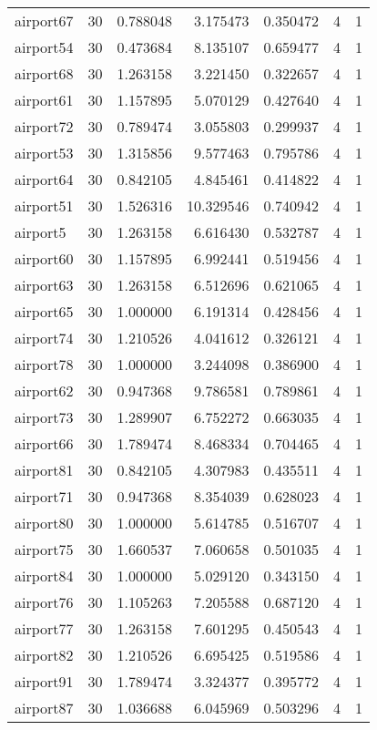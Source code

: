 \documentclass[../../../thesis.tex]{subfiles}
\begin{document}
\begin{longtable}{|l|r|r|r|r|r|r|}
airport67 & 30 & 0.788048 & 3.175473 & 0.350472 & 4 & 1 \\
airport54 & 30 & 0.473684 & 8.135107 & 0.659477 & 4 & 1 \\
airport68 & 30 & 1.263158 & 3.221450 & 0.322657 & 4 & 1 \\
airport61 & 30 & 1.157895 & 5.070129 & 0.427640 & 4 & 1 \\
airport72 & 30 & 0.789474 & 3.055803 & 0.299937 & 4 & 1 \\
airport53 & 30 & 1.315856 & 9.577463 & 0.795786 & 4 & 1 \\
airport64 & 30 & 0.842105 & 4.845461 & 0.414822 & 4 & 1 \\
airport51 & 30 & 1.526316 & 10.329546 & 0.740942 & 4 & 1 \\
airport5 & 30 & 1.263158 & 6.616430 & 0.532787 & 4 & 1 \\
airport60 & 30 & 1.157895 & 6.992441 & 0.519456 & 4 & 1 \\
airport63 & 30 & 1.263158 & 6.512696 & 0.621065 & 4 & 1 \\
airport65 & 30 & 1.000000 & 6.191314 & 0.428456 & 4 & 1 \\
airport74 & 30 & 1.210526 & 4.041612 & 0.326121 & 4 & 1 \\
airport78 & 30 & 1.000000 & 3.244098 & 0.386900 & 4 & 1 \\
airport62 & 30 & 0.947368 & 9.786581 & 0.789861 & 4 & 1 \\
airport73 & 30 & 1.289907 & 6.752272 & 0.663035 & 4 & 1 \\
airport66 & 30 & 1.789474 & 8.468334 & 0.704465 & 4 & 1 \\
airport81 & 30 & 0.842105 & 4.307983 & 0.435511 & 4 & 1 \\
airport71 & 30 & 0.947368 & 8.354039 & 0.628023 & 4 & 1 \\
airport80 & 30 & 1.000000 & 5.614785 & 0.516707 & 4 & 1 \\
airport75 & 30 & 1.660537 & 7.060658 & 0.501035 & 4 & 1 \\
airport84 & 30 & 1.000000 & 5.029120 & 0.343150 & 4 & 1 \\
airport76 & 30 & 1.105263 & 7.205588 & 0.687120 & 4 & 1 \\
airport77 & 30 & 1.263158 & 7.601295 & 0.450543 & 4 & 1 \\
airport82 & 30 & 1.210526 & 6.695425 & 0.519586 & 4 & 1 \\
airport91 & 30 & 1.789474 & 3.324377 & 0.395772 & 4 & 1 \\
airport87 & 30 & 1.036688 & 6.045969 & 0.503296 & 4 & 1 \\

\end{longtable}
\end{document}
